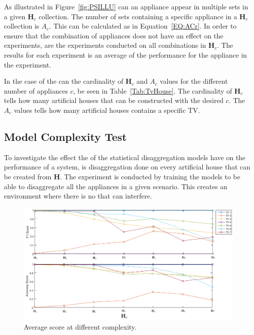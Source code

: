 As illustrated in Figure~\ref{fig:PSILLU} can an appliance appear in multiple sets in a given $\textbf{H}_c$ collection. The number of sets containing a specific appliance in a $\textbf{H}_c$ collection is $A_c$. This can be calculated as in Equation~\ref{EQ:ACr}. In order to ensure that the combination of appliances does not have an effect on the experiments, are the experiments conducted on all combinations in $\textbf{H}_c$. The results for each experiment is an average of the performance for the appliance in the experiment. 



In the case of the  can the cardinality of $\textbf{H}_c$ and $A_c$ values for the different number of appliances $c$, be seen in Table~\ref{Tab:TvHouse}. The cardinality of $\textbf{H}_c$ tells how many artificial houses that can be constructed with the desired  $c$. The $A_c$ values tells how many artificial houses contains a specific TV.


\subsection{Model Complexity Test}
\label{sec:MCT}
To investigate the effect the  of the statistical disaggregation models have on the performance of a  system, is disaggregation done on every artificial house that can be created from $\textbf{H}$. The experiment is conducted by training the models to be able to disaggregate all the appliances in a given scenario. This creates an environment where there is no  that can interfere.

\begin{figure}[H]
\centering
\includegraphics[width=1\textwidth]{billeder/ModelSize.png}
\caption{Average score at different complexity.}
\label{fig:COMPT}
\end{figure}

